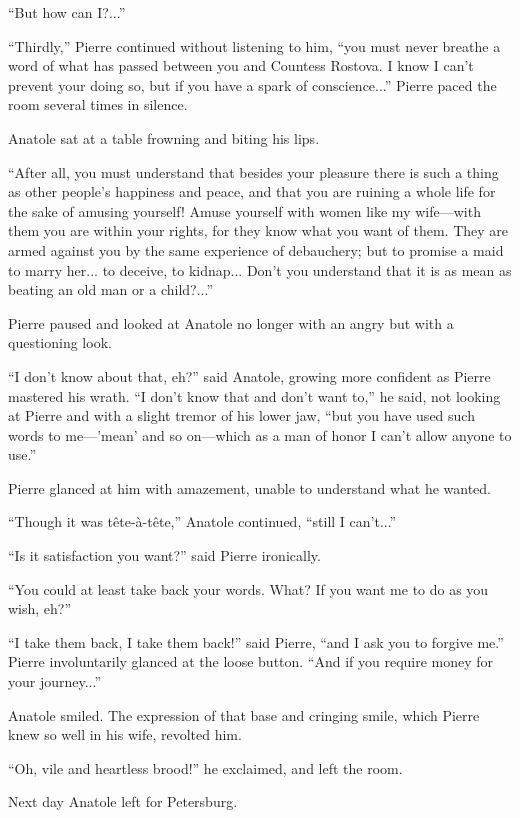 ``But how can I?...''

``Thirdly,'' Pierre continued without listening to him, ``you
must never breathe a word of what has passed between you and
Countess Rostova. I know I can't prevent your doing so, but if
you have a spark of conscience...'' Pierre paced the room several
times in silence.

Anatole sat at a table frowning and biting his lips.

``After all, you must understand that besides your pleasure there
is such a thing as other people's happiness and peace, and that
you are ruining a whole life for the sake of amusing yourself!
Amuse yourself with women like my wife---with them you are within
your rights, for they know what you want of them. They are armed
against you by the same experience of debauchery; but to promise
a maid to marry her... to deceive, to kidnap... Don't you
understand that it is as mean as beating an old man or a
child?...''

Pierre paused and looked at Anatole no longer with an angry but
with a questioning look.

``I don't know about that, eh?'' said Anatole, growing more
confident as Pierre mastered his wrath. ``I don't know that and
don't want to,'' he said, not looking at Pierre and with a slight
tremor of his lower jaw, ``but you have used such words to
me---'mean' and so on---which as a man of honor I can't allow
anyone to use.''

Pierre glanced at him with amazement, unable to understand what
he wanted.

``Though it was tête-à-tête,'' Anatole continued, ``still I
can't...''

``Is it satisfaction you want?'' said Pierre ironically.

``You could at least take back your words. What? If you want me
to do as you wish, eh?''

``I take them back, I take them back!'' said Pierre, ``and I ask
you to forgive me.'' Pierre involuntarily glanced at the loose
button. ``And if you require money for your journey...''

Anatole smiled. The expression of that base and cringing smile,
which Pierre knew so well in his wife, revolted him.

``Oh, vile and heartless brood!'' he exclaimed, and left the
room.

Next day Anatole left for Petersburg.


